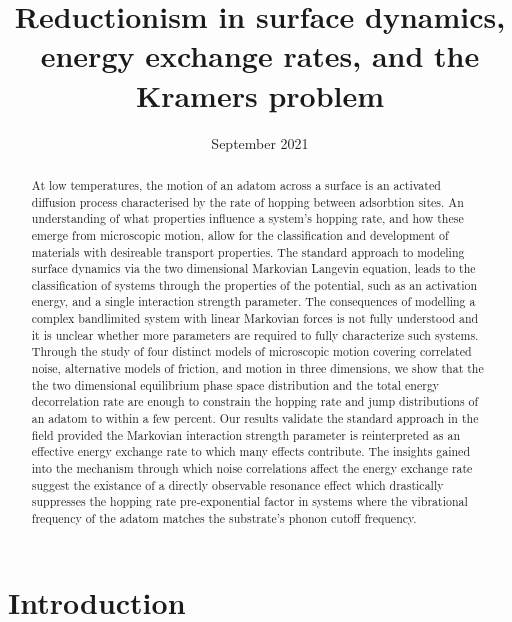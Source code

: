 \documentclass[7pt]{article}
\title{Reductionism in surface dynamics, energy exchange rates, and the Kramers problem}
\date{September 2021}
\begin{document}
\maketitle

\begin{abstract}
	At low temperatures, the motion of an adatom across a surface is an activated diffusion process characterised by the rate of hopping between adsorbtion sites. An understanding of what properties influence a system's hopping rate, and how these emerge from microscopic motion, allow for the classification and development of materials with desireable transport properties. The standard approach to modeling surface dynamics via the two dimensional Markovian Langevin equation, leads to the classification of systems through the properties of the potential, such as an activation energy, and a single interaction strength parameter. The consequences of modelling a complex bandlimited system with linear Markovian forces is not fully understood and it is unclear whether more parameters are required to fully characterize such systems. Through the study of four distinct models of microscopic motion covering correlated noise, alternative models of friction, and motion in three dimensions, we show that the the two dimensional equilibrium phase space distribution and the total energy decorrelation rate are enough to constrain the hopping rate and jump distributions of an adatom to within a few percent. Our results validate the standard approach in the field provided the Markovian interaction strength parameter is reinterpreted as an effective energy exchange rate to which many effects contribute. The insights gained into the mechanism through which noise correlations affect the energy exchange rate suggest the existance of a directly observable resonance effect which drastically suppresses the hopping rate pre-exponential factor in systems where the vibrational frequency of the adatom matches the substrate's phonon cutoff frequency.  

\end{abstract}

\section*{Introduction}
\end{document}
